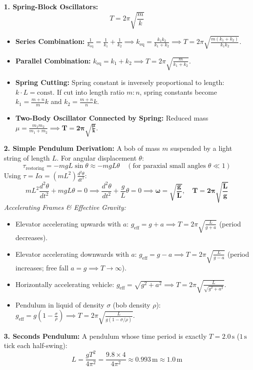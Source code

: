\documentclass[10pt,a4paper]{article}
\begin{document}
\begin{formulabox}
\textbf{1. Spring-Block Oscillators:}
\begin{equation}
  T = 2\pi \sqrt{\frac{m}{k}}
\end{equation}
\begin{itemize}
  \item \textbf{Series Combination:} $\frac{1}{k_{\text{eq}}} = \frac{1}{k_1} + \frac{1}{k_2} \implies k_{\text{eq}} = \frac{k_1 k_2}{k_1 + k_2} \implies T = 2\pi\sqrt{\frac{m(k_1+k_2)}{k_1 k_2}}$.
  \item \textbf{Parallel Combination:} $k_{\text{eq}} = k_1 + k_2 \implies T = 2\pi\sqrt{\frac{m}{k_1 + k_2}}$.
  \item \textbf{Spring Cutting:} Spring constant is inversely proportional to length: $k \cdot L = \text{const}$. If cut into length ratio $m : n$, spring constants become $k_1 = \frac{m+n}{m}k$ and $k_2 = \frac{m+n}{n}k$.
  \item \textbf{Two-Body Oscillator Connected by Spring:} Reduced mass $\mu = \frac{m_1 m_2}{m_1 + m_2} \implies \mathbf{T = 2\pi\sqrt{\frac{\mu}{k}}}$.
\end{itemize}
\textbf{2. Simple Pendulum Derivation:}
A bob of mass $m$ suspended by a light string of length $L$. For angular displacement $\theta$:
\begin{equation}
  \tau_{\text{restoring}} = -m g L \sin\theta \approx -m g L \theta \quad (\text{for paraxial small angles } \theta \ll 1)
\end{equation}
Using $\tau = I \alpha = (m L^2) \frac{d^2\theta}{dt^2}$:
\begin{equation}
  m L^2 \frac{d^2\theta}{dt^2} + m g L \theta = 0 \implies \frac{d^2\theta}{dt^2} + \frac{g}{L}\theta = 0 \implies \mathbf{\omega = \sqrt{\frac{g}{L}}}, \quad \mathbf{T = 2\pi\sqrt{\frac{L}{g}}}
\end{equation}
\textit{Accelerating Frames \& Effective Gravity:}
\begin{itemize}
  \item Elevator accelerating upwards with $a$: $g_{\text{eff}} = g + a \implies T = 2\pi\sqrt{\frac{L}{g+a}}$ (period decreases).
  \item Elevator accelerating downwards with $a$: $g_{\text{eff}} = g - a \implies T = 2\pi\sqrt{\frac{L}{g-a}}$ (period increases; free fall $a=g \implies T \to \infty$).
  \item Horizontally accelerating vehicle: $g_{\text{eff}} = \sqrt{g^2 + a^2} \implies T = 2\pi\sqrt{\frac{L}{\sqrt{g^2 + a^2}}}$.
  \item Pendulum in liquid of density $\sigma$ (bob density $\rho$): $g_{\text{eff}} = g\left(1 - \frac{\sigma}{\rho}\right) \implies T = 2\pi\sqrt{\frac{L}{g(1 - \sigma/\rho)}}$.
\end{itemize}
\textbf{3. Seconds Pendulum:} A pendulum whose time period is exactly $T = 2.0\,\mathrm{s}$ ($1\,\mathrm{s}$ tick each half-swing):
\begin{equation}
  L = \frac{g T^2}{4\pi^2} = \frac{9.8 \times 4}{4\pi^2} \approx \mathbf{0.993\,\mathrm{m} \approx 1.0\,\mathrm{m}}
\end{equation}
\end{formulabox}
\end{document}
